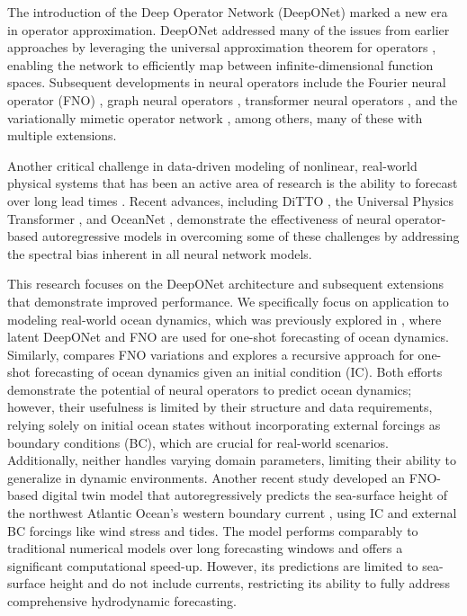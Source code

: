 \documentclass[draft]{agujournal2019}
\begin{document}
The introduction of the Deep Operator Network (DeepONet) \cite{lu2021learning} marked a new era in operator approximation. DeepONet addressed many of the issues from earlier approaches by leveraging the universal approximation theorem for operators \cite{chen1995universal}, enabling the network to efficiently map between infinite-dimensional function spaces. Subsequent developments in neural operators include the Fourier neural operator (FNO) \cite{li2020fourier}, graph neural operators \cite{li2020neural}, transformer neural operators \cite{cao2021choose}, and the variationally mimetic operator network \cite{patel2024variationally}, among others, many of these with multiple extensions. 

Another critical challenge in data-driven modeling of nonlinear, real-world physical systems that has been an active area of research is the ability to forecast over long lead times \cite{10.1145/3533382, bodnar2024aurora, lam2022graphcast, lim2021time}. Recent advances, including DiTTO \cite{ovadia2023ditto}, the Universal Physics Transformer \cite{alkin2024universal}, and OceanNet \cite{chattopadhyay2024oceannet}, demonstrate the effectiveness of neural operator-based autoregressive models in overcoming some of these challenges by addressing the spectral bias inherent in all neural network models. 

This research focuses on the DeepONet architecture and subsequent extensions \cite{jin2022mionet, kontolati2023learning, ovadia2023ditto, wang2022improved} that demonstrate improved performance. We specifically focus on application to modeling real-world ocean dynamics, which was previously explored in , where latent DeepONet and FNO are used for one-shot forecasting of ocean dynamics. Similarly,  compares FNO variations and explores a recursive approach for one-shot forecasting of ocean dynamics given an initial condition (IC). Both efforts demonstrate the potential of neural operators to predict ocean dynamics; however, their usefulness is limited by their structure and data requirements, relying solely on initial ocean states without incorporating external forcings as boundary conditions (BC), which are crucial for real-world scenarios. Additionally, neither handles varying domain parameters, limiting their ability to generalize in dynamic environments. Another recent study developed an FNO-based digital twin model that autoregressively predicts the sea-surface height of the northwest Atlantic Ocean’s western boundary current \cite{chattopadhyay2024oceannet}, using IC and external BC forcings like wind stress and tides. The model performs comparably to traditional numerical models over long forecasting windows and offers a significant computational speed-up. However, its predictions are limited to sea-surface height and do not include currents, restricting its ability to fully address comprehensive hydrodynamic forecasting.
\end{document}
